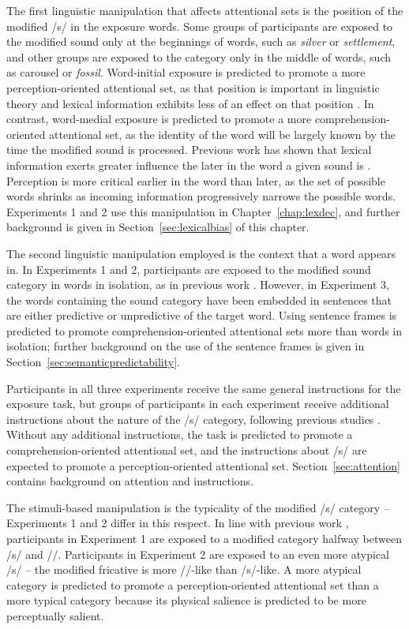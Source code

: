 The first linguistic manipulation that affects attentional sets is the position of the modified /s/ in the exposure words.  
Some groups of participants are exposed to the modified sound only at the beginnings of words, such as \emph{silver} or \emph{settlement}, and other groups are exposed to the category only in the middle of words, such as {carousel} or \emph{fossil}.
Word-initial exposure is predicted to promote a more perception-oriented attentional set, as that position is important in linguistic theory \citep{Beckman1998} and lexical information exhibits less of an effect on that position \citep{Pitt2006}.
In contrast, word-medial exposure is predicted to promote a more comprehension-oriented attentional set, as the identity of the word will be largely known by the time the modified sound is processed.  
Previous work has shown that lexical information exerts greater influence the later in the word a given sound is \citep{Pitt2006}.
Perception is more critical earlier in the word than later, as the set of possible words shrinks as incoming information progressively narrows the possible words.
Experiments 1 and 2 use this manipulation in Chapter~\ref{chap:lexdec}, and further background is given in Section~\ref{sec:lexicalbias} of this chapter.

The second linguistic manipulation employed is the context that a word appears in.  
In Experiments 1 and 2, participants are exposed to the modified sound category in words in isolation, as in previous work \citep{Norris2003}.  
However, in Experiment 3, the words containing the sound category have been embedded in sentences that are either predictive or unpredictive of the target word.
Using sentence frames is predicted to promote comprehension-oriented attentional sets more than words in isolation; further background on the use of the sentence frames is given in Section~\ref{sec:semanticpredictability}.

Participants in all three experiments receive the same general instructions for the exposure task, but groups of participants in each experiment receive additional instructions about the nature of the /s/ category, following previous studies \citep{Pitt2012}.
Without any additional instructions, the task is predicted to promote a comprehension-oriented attentional set, and the instructions about /s/ are expected to promote a perception-oriented attentional set.
Section~\ref{sec:attention} contains background on attention and instructions.

The stimuli-based manipulation is the typicality of the modified /s/ category -- Experiments 1 and 2 differ in this respect. In line with previous work \citep{Norris2003}, participants in Experiment 1 are exposed to a modified category halfway between /s/ and /\textesh/. Participants in Experiment 2 are exposed to an even more atypical /s/ -- the modified fricative is more /\textesh/-like than /s/-like.  A more atypical category is predicted to promote a perception-oriented attentional set than a more typical category because its physical salience is predicted to be more perceptually salient.

